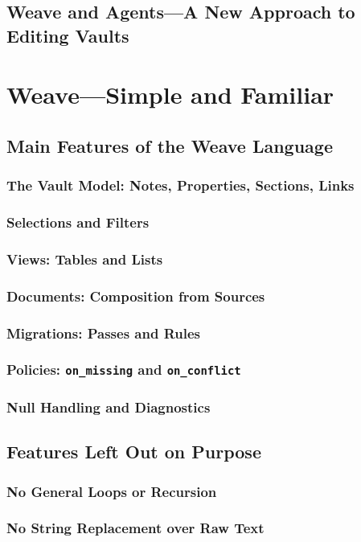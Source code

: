 \documentclass[nohyper,nobib]{tufte-book}
\begin{document}
\section{Weave and Agents---A New Approach to Editing Vaults}

\chapter{Weave---Simple and Familiar}
\section{Main Features of the Weave Language}
\subsection{The Vault Model: Notes, Properties, Sections, Links}
\subsection{Selections and Filters}
\subsection{Views: Tables and Lists}
\subsection{Documents: Composition from Sources}
\subsection{Migrations: Passes and Rules}
\subsection{Policies: \texttt{on\_missing} and \texttt{on\_conflict}}
\subsection{Null Handling and Diagnostics}
\section{Features Left Out on Purpose}
\subsection{No General Loops or Recursion}
\subsection{No String Replacement over Raw Text}
\end{document}
